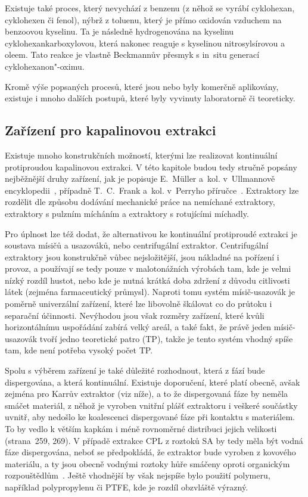 Existuje také proces, který nevychází z benzenu (z něhož se vyrábí cyklohexan, cyklohexen či fenol), nýbrž z toluenu, který je přímo oxidován vzduchem na benzoovou kyselinu.
Ta je následně hydrogenována na kyselinu cyklohexankarboxylovou, která nakonec reaguje s kyselinou nitrosylsírovou a oleem.
Tato reakce je vlastně Beckmannův přesmyk s in~situ generací cyklohexanon"-oximu.

Kromě výše popsaných procesů, které jsou nebo byly komerčně aplikovány, existuje i mnoho dalších postupů, které byly vyvinuty laboratorně či teoreticky.



\subsection{Zařízení pro kapalinovou extrakci} \label{extraction}
Existuje mnoho konstrukčních možností, kterými lze realizovat kontinuální protiproudou kapalinovou extrakci.
V této kapitole budou tedy stručně popsány nejběžnější druhy zařízení, jak je popisuje E.~Müller a~kol. v~Ullmannově encyklopedii~\cite{Ullmann_Extraction}, případně T.~C.~Frank a~kol. v~Perryho příručce~\cite{Perry_15}.
Extraktory lze rozdělit dle způsobu dodávání mechanické práce na nemíchané extraktory, extraktory s pulzním mícháním a extraktory s rotujícími míchadly.

Pro úplnost lze též dodat, že alternativou ke kontinuální protiproudé extrakci je soustava mísičů a usazováků, nebo centrifugální extraktor.
Centrifugální extraktory jsou konstrukčně vůbec nejsložitější, jsou nákladné na pořízení i provoz, a používají se tedy pouze v malotonážních výrobách tam, kde je velmi nízký rozdíl hustot, nebo kde je nutná krátká doba zdržení z důvodu citlivosti látek (zejména farmaceutický průmysl).
Naproti tomu systém mísič-usazovák je poměrně univerzální zařízení, které lze libovolně škálovat co do průtoku i separační účinnosti.
Nevýhodou jsou však rozměry zařízení, které kvůli horizontálnímu uspořádání zabírá velký areál, a také fakt, že právě jeden mísič-usazovák tvoří jedno teoretické patro (TP), takže je tento systém vhodný spíše tam, kde není potřeba vysoký počet TP.

Spolu s výběrem zařízení je také důležité rozhodnout, která z fází bude dispergována, a která kontinuální.
Existuje doporučení, které platí obecně, avšak zejména pro Karrův extraktor (viz níže), a to že dispergovaná fáze by neměla smáčet materiál, z něhož je vyroben vnitřní plášť extraktoru i veškeré součástky uvnitř, aby nedošlo ke koalescenci dispergované fáze při kontaktu s materiálem.
To by vedlo k větším kapkám i méně rovnoměrné distribuci jejich velikosti~\cite{Ullmann_Extraction} (strana~259, 269).
V případě extrakce CPL z roztoků SA by tedy měla být vodná fáze dispergována, neboť se předpokládá, že extraktor bude vyroben z kovového materiálu, a ty jsou obecně vodnými roztoky hůře smáčeny oproti organickým rozpouštědlům~\cite{Zbytovsky2018}.
Ještě vhodnější by však nejspíše bylo použití polymeru, například polypropylenu či PTFE, kde je rozdíl obzvláště výrazný.

